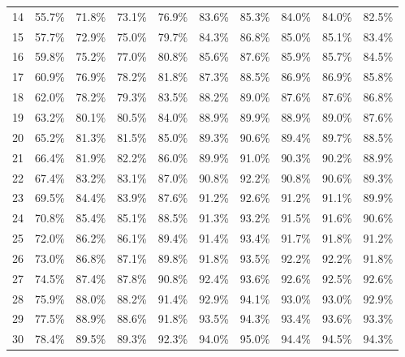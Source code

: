 \begin{table}[h]
\begin{center}
\begin{tabular}{c|p{1.2cm}p{1.1cm}p{1.1cm}p{1.7cm}p{1.5cm}p{1.2cm}p{1.2cm}p{1.2cm}p{1.2cm}}
	14 & 55.7\% & 71.8\% & 73.1\% & 76.9\% & 83.6\% & 85.3\% & 84.0\% & 84.0\% & 82.5\% \\ 
	15 & 57.7\% & 72.9\% & 75.0\% & 79.7\% & 84.3\% & 86.8\% & 85.0\% & 85.1\% & 83.4\% \\ 
	16 & 59.8\% & 75.2\% & 77.0\% & 80.8\% & 85.6\% & 87.6\% & 85.9\% & 85.7\% & 84.5\% \\ 
	17 & 60.9\% & 76.9\% & 78.2\% & 81.8\% & 87.3\% & 88.5\% & 86.9\% & 86.9\% & 85.8\% \\ 
	18 & 62.0\% & 78.2\% & 79.3\% & 83.5\% & 88.2\% & 89.0\% & 87.6\% & 87.6\% & 86.8\% \\ 
	19 & 63.2\% & 80.1\% & 80.5\% & 84.0\% & 88.9\% & 89.9\% & 88.9\% & 89.0\% & 87.6\% \\ 
	20 & 65.2\% & 81.3\% & 81.5\% & 85.0\% & 89.3\% & 90.6\% & 89.4\% & 89.7\% & 88.5\% \\ 
	21 & 66.4\% & 81.9\% & 82.2\% & 86.0\% & 89.9\% & 91.0\% & 90.3\% & 90.2\% & 88.9\% \\ 
	22 & 67.4\% & 83.2\% & 83.1\% & 87.0\% & 90.8\% & 92.2\% & 90.8\% & 90.6\% & 89.3\% \\ 
	23 & 69.5\% & 84.4\% & 83.9\% & 87.6\% & 91.2\% & 92.6\% & 91.2\% & 91.1\% & 89.9\% \\ 
	24 & 70.8\% & 85.4\% & 85.1\% & 88.5\% & 91.3\% & 93.2\% & 91.5\% & 91.6\% & 90.6\% \\ 
	25 & 72.0\% & 86.2\% & 86.1\% & 89.4\% & 91.4\% & 93.4\% & 91.7\% & 91.8\% & 91.2\% \\ 
	26 & 73.0\% & 86.8\% & 87.1\% & 89.8\% & 91.8\% & 93.5\% & 92.2\% & 92.2\% & 91.8\% \\ 
	27 & 74.5\% & 87.4\% & 87.8\% & 90.8\% & 92.4\% & 93.6\% & 92.6\% & 92.5\% & 92.6\% \\ 
	28 & 75.9\% & 88.0\% & 88.2\% & 91.4\% & 92.9\% & 94.1\% & 93.0\% & 93.0\% & 92.9\% \\ 
	29 & 77.5\% & 88.9\% & 88.6\% & 91.8\% & 93.5\% & 94.3\% & 93.4\% & 93.6\% & 93.3\% \\ 
	30 & 78.4\% & 89.5\% & 89.3\% & 92.3\% & 94.0\% & 95.0\% & 94.4\% & 94.5\% & 94.3\% \\
	\hline\hline
    \end{tabular}
    \label{tab:media_eigen}
    \end{center}
\end{table}	

